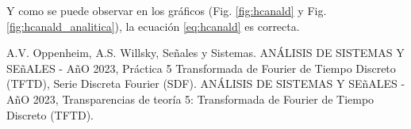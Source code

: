 \documentclass[letterpaper, 10 pt, conference]{ieeeconf}  %
\begin{document}
Y como se puede observar en los gr\'aficos (Fig. \ref{fig:hcanald} y Fig. \ref{fig:hcanald_analitica}), la ecuaci\'on \ref{eq:hcanald} es correcta.

\begin{thebibliography}{99}
  
A.V. Oppenheim, A.S. Willsky, Se\~nales y Sistemas.
ANÁLISIS DE SISTEMAS Y SE\~{n}ALES - A\~{n}O 2023, Práctica 5 Transformada de Fourier de Tiempo Discreto (TFTD), Serie Discreta Fourier (SDF).
ANÁLISIS DE SISTEMAS Y SE\~{n}ALES - A\~{n}O 2023, Transparencias de teor\'ia 5: Transformada de Fourier de Tiempo Discreto (TFTD).

\end{thebibliography}
\end{document}
